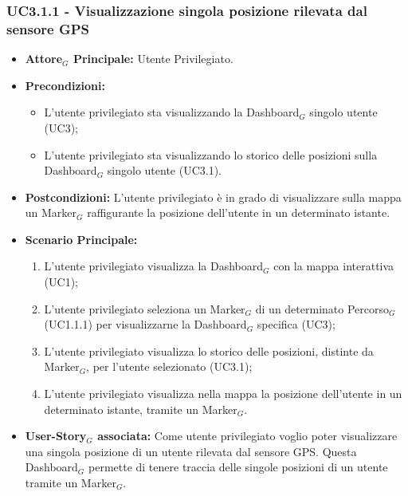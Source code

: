 \documentclass[10pt]{article}
\begin{document}
\begin{justify}
\subsubsection{\textbf{UC3.1.1 - Visualizzazione singola posizione rilevata dal sensore GPS}}
\label{UC3.1.1}
\begin{itemize}
     \item \textbf{Attore$_G$ Principale:} Utente Privilegiato.
     \item \textbf{Precondizioni:}
        \begin{itemize}
    		\item L'utente privilegiato sta visualizzando la Dashboard$_G$ singolo utente (UC3);
    		\item L'utente privilegiato sta visualizzando lo storico delle posizioni sulla Dashboard$_G$ singolo utente (UC3.1).
        \end{itemize}
     \item \textbf{Postcondizioni:} L'utente privilegiato è in grado di visualizzare sulla mappa un Marker$_G$ raffigurante la posizione dell'utente in un determinato istante.
     \item \textbf{Scenario Principale:}
        \begin{enumerate}
            \item L'utente privilegiato visualizza la Dashboard$_G$ con la mappa interattiva (UC1);
            \item L'utente privilegiato seleziona un Marker$_G$ di un determinato Percorso$_G$ (UC1.1.1) per visualizzarne la Dashboard$_G$ specifica (UC3);
            \item L'utente privilegiato visualizza lo storico delle posizioni, distinte da Marker$_G$, per l'utente selezionato (UC3.1);
            \item L'utente privilegiato visualizza nella mappa la posizione dell'utente in un determinato istante, tramite un Marker$_G$.
        \end{enumerate}
     \item \textbf{User-Story$_G$ associata:}
     Come utente privilegiato voglio poter visualizzare una singola posizione di un utente rilevata dal sensore GPS. Questa Dashboard$_G$ permette di tenere traccia delle singole posizioni di un utente tramite un Marker$_G$.
\end{itemize}

\end{justify}
\end{document}
